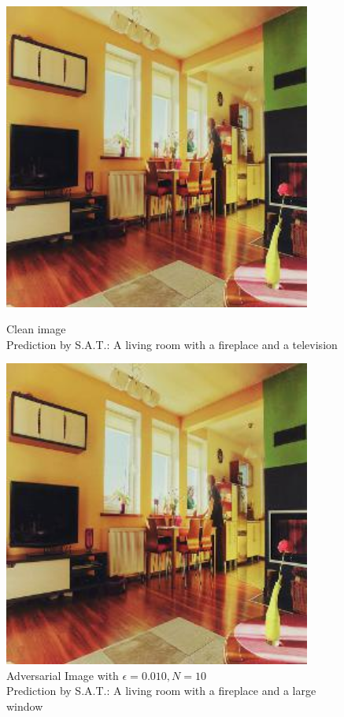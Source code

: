 \begin{figure}[ht]
    \centering
    \begin{minipage}{0.45\textwidth}
        \centering
        \includegraphics[width=0.9\textwidth]{figures/ShowDistractAndDeceive/n=10/samples/0.000/img_0.jpg} %
        \caption*{Clean image\\Prediction by S.A.T.: A living room with a fireplace and a television}
    \end{minipage}\hfill
    \begin{minipage}{0.45\textwidth}
        \centering
        \includegraphics[width=0.9\textwidth]{figures/ShowDistractAndDeceive/n=10/samples/0.010/img_0.jpg} %
        \caption*{Adversarial Image with $\epsilon=0.010, N=10$\\Prediction by S.A.T.: A living room with a fireplace and a large window}
    \end{minipage}
\end{figure}


